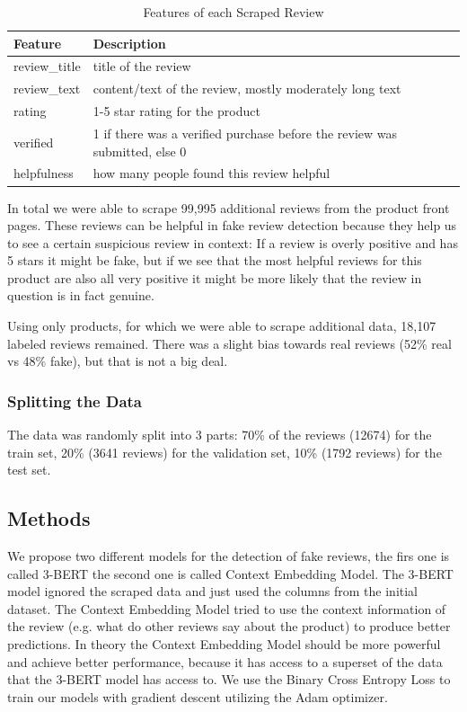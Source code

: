 \documentclass{article}
\begin{document}
\begin{table}[ht]
  \centering
  \caption{Features of each Scraped Review}
  \label{tab:feat2rev}
  \begin{tabular}{l p{6cm}}
    Feature       & Description                                                                \\
    \hline
    review\_title & title of the review                                                        \\
    review\_text  & content/text of the review, mostly moderately long text                    \\
    rating        & 1-5 star rating for the product                                            \\
    verified      & 1 if there was a verified purchase before the review was submitted, else 0 \\
    helpfulness   & how many people found this review helpful                                  \\
  \end{tabular}
\end{table}

In total we were able to scrape 99,995 additional reviews from the product front pages. These reviews can be helpful in fake review detection because they help us to see a certain suspicious review in context: If a review is overly positive and has 5 stars it might be fake, but if we see that the most helpful reviews for this product are also all very positive it might be more likely that the review in question is in fact genuine.

Using only products, for which we were able to scrape additional data, 18,107 labeled reviews remained.
There was a slight bias towards real reviews (52\% real vs 48\% fake), but that is not a big deal.

\subsubsection{Splitting the Data}

The data was randomly split into 3 parts: 70\% of the reviews (12674) for the train set, 20\% (3641 reviews) for the validation set, 10\% (1792 reviews) for the test set.

\subsection{Methods}

We propose two different models for the detection of fake reviews, the firs one is called 3-BERT the second one is called Context Embedding Model. The 3-BERT model ignored the scraped data and just used the columns from the initial dataset. The Context Embedding Model tried to use the context information of the review (e.g. what do other reviews say about the product) to produce better predictions. In theory the Context Embedding Model should be more powerful and achieve better performance, because it has access to a superset of the data that the 3-BERT model has access to.
We use the Binary Cross Entropy Loss to train our models with gradient descent utilizing the Adam optimizer.
\end{document}
